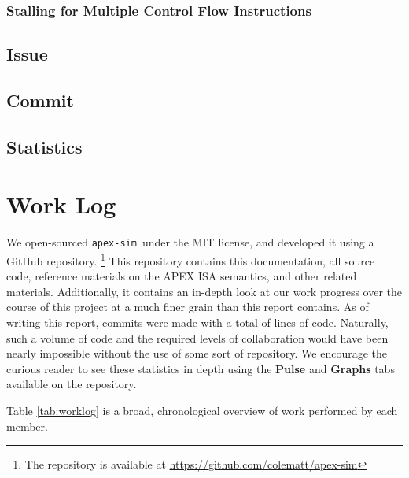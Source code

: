\documentclass[12pt]{article}
\newcommand{\codename}[0]{\texttt{apex-sim}~}
\begin{document}
\subsubsection{Stalling for Multiple Control Flow Instructions}

\subsection{Issue}

\subsection{Commit}

\subsection{Statistics}


\section{Work Log}
\label{sec:worklog}
We open-sourced \codename under the MIT license, and developed it using a GitHub repository. \footnote{The repository is available at \url{https://github.com/colematt/apex-sim}}
This repository contains this documentation, all source code, reference materials on the APEX ISA semantics, and other related materials.
Additionally, it contains an in-depth look at our work progress over the course of this project at a much finer grain than this report contains.
As of writing this report,  commits were made with a total of  lines of code.
Naturally, such a volume of code and the required levels of collaboration would have been nearly impossible without the use of some sort of repository.
We encourage the curious reader to see these statistics in depth using the \textbf{Pulse} and \textbf{Graphs} tabs available on the repository.

Table \ref{tab:worklog} is a broad, chronological overview of work performed by each member.
\end{document}

